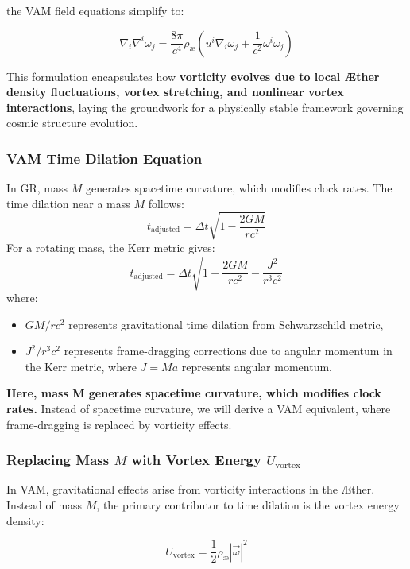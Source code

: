 \documentclass[a4paper,10pt]{article}
\begin{document}
the VAM field equations simplify to:

\begin{equation*}
    \nabla_i \nabla^i \omega_j = \frac{8\pi}{c^4} \rho_\text{\ae} \left( u^i \nabla_i \omega_j + \frac{1}{c^2} \omega^i \omega_j \right)
\end{equation*}

This formulation encapsulates how \textbf{vorticity evolves due to local Æther density fluctuations, vortex stretching, and nonlinear vortex interactions}, laying the groundwork for a physically stable framework governing cosmic structure evolution.

\subsubsection*{VAM Time Dilation Equation}
In GR, mass $M$ generates spacetime curvature, which modifies clock rates. The time dilation near a mass $M$ follows:
\begin{equation*}
    t_\text{adjusted} = \Delta t \sqrt{1 - \frac{2GM}{rc^2}}
\end{equation*}
For a rotating mass, the Kerr metric gives:
\begin{equation*}
    t_\text{adjusted} = \Delta t \sqrt{1 - \frac{2GM}{r c^2} - \frac{J^2}{r^3 c^2}}
\end{equation*}
where:
\begin{itemize}
    \item $GM/r c^2$ represents gravitational time dilation from Schwarzschild metric,
    \item $J^2/r^3 c^2$ represents frame-dragging corrections due to angular momentum in the Kerr metric, where $J = M a$ represents angular momentum.
\end{itemize}

\textbf{Here, mass M generates spacetime curvature, which modifies clock rates.}
Instead of spacetime curvature, we will derive a VAM equivalent, where frame-dragging is replaced by vorticity effects.

\subsubsection*{Replacing Mass $M$ with Vortex Energy $U_\text{vortex}$}
In VAM, gravitational effects arise from vorticity interactions in the Æther. Instead of mass $M$, the primary contributor to time dilation is the vortex energy density:


\begin{equation*}
    U_\text{vortex} = \frac{1}{2} \rho_\text{\ae} |\vec{\omega}|^2
\end{equation*}
\end{document}
